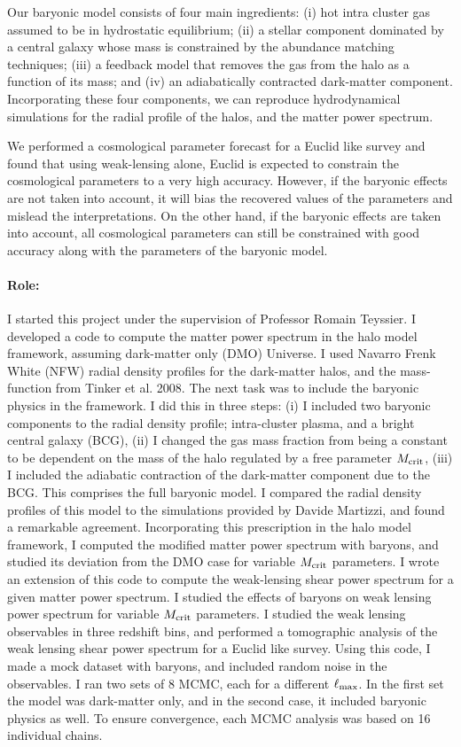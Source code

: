 \documentclass[
  11pt,
  twoside,
  openright,
  titlepage,
  headings=optiontoheadandtoc
]{scrbook}
\begin{document}
Our baryonic model consists of four main ingredients: 
(i) hot intra cluster gas assumed to be in hydrostatic equilibrium;
(ii) a stellar component dominated by a central galaxy 
whose mass is constrained by the abundance matching techniques;
(iii) a feedback model that removes the gas from the halo as a function
of its mass; and 
(iv) an adiabatically contracted dark-matter component. 
Incorporating these four components, 
we can reproduce hydrodynamical simulations 
for the radial profile of the halos, and the matter power spectrum. 

We performed a cosmological parameter forecast for a Euclid like survey and found that using
weak-lensing alone, Euclid is expected to constrain the cosmological parameters to a very
high accuracy. However, if the baryonic effects are not taken into account, it will bias
the recovered values of the parameters and mislead the interpretations. On the other hand,
if the baryonic effects are taken into account, all cosmological
parameters can still be constrained with good accuracy along with the parameters
of the baryonic model.

\paragraph{Role:} I started this project under the supervision of Professor Romain Teyssier. 
I developed a code to compute the matter power spectrum
in the halo model framework, assuming dark-matter only (DMO) Universe. 
I used Navarro Frenk White (NFW) radial density profiles for the 
dark-matter halos, and the mass-function from 
Tinker et al. 2008. The next task was to include the baryonic
physics in the framework. 
I did this in three steps: (i) I included two baryonic components
to the radial density profile; intra-cluster plasma, 
and a bright central galaxy (BCG), (ii) I changed 
the gas mass fraction from being a constant to be dependent on the mass
of the halo regulated by a free parameter $M_{\rm crit}$, (iii)
I included the adiabatic contraction of the dark-matter component
due to the BCG. This comprises the full baryonic
model. I compared the radial density profiles of this model
to the simulations provided by Davide Martizzi, and found 
a remarkable agreement. 
Incorporating this prescription in the halo model framework, I computed
the modified matter power spectrum with baryons, and studied its
deviation from the DMO case for variable 
$M_{\rm crit}$ parameters.  
I wrote an extension of this code to compute the weak-lensing
shear power spectrum for a given matter power spectrum. I studied
the effects of baryons on weak lensing power spectrum
for variable $M_{\rm crit}$ parameters. I studied the weak lensing
observables in three redshift bins, and performed a tomographic 
analysis of the weak lensing shear power spectrum for a Euclid like
survey. Using this code, I made a mock dataset with baryons, and included
random noise in the observables.
I ran two sets of 8 MCMC, each for a different $\ell_{\rm max}$.
In the first
set the model was dark-matter only, and in the second case, it included
baryonic physics as well. 
To ensure convergence, each MCMC analysis was based on  
16 individual chains. 
\end{document}
